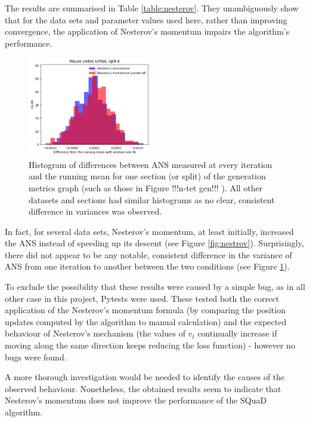 \documentclass{l4proj}
\begin{document}
The results are summarised in Table \ref{table:nesterov}. They unambiguously show that for the data sets and parameter values used here, rather than improving convergence, the application of Nesterov's momentum impairs the algorithm's performance. 

\begin{figure}
    \includegraphics[width=0.48\textwidth]{images/nesterov/histogram.png}

  \caption{Histogram of differences between ANS measured at every iteration and the running mean for one section (or split) of the generation metrics graph (such as those in Figure !!!n-tet gen!!! ). All other datasets and sections had similar histograms as no clear, consistent difference in variances was observed.}
\label{fig:histogram}
\end{figure}

In fact, for several data sets, Nesterov's momentum, at least initially, increased the ANS instead of speeding up its descent (see Figure \ref{fig:nestrov}). Surprisingly, there did not appear to be any notable, consistent difference in the variance of ANS from one iteration to another between the two conditions (see Figure \ref{fig:histogram}).

 To exclude the possibility that these results were caused by a simple bug, as in all other case in this project, Pytests were used. These tested both the correct application of the Nesterov's momentum formula (by comparing the position updates computed by the algorithm to manual calculation) and the expected behaviour of Nesterov's mechanism (the values of $v_t$ continually increase if moving along the same direction keeps reducing the loss function) - however no bugs were found. 

 A more thorough investigation would be needed to identify the causes of the observed behaviour. Nonetheless, the obtained results seem to indicate that Nesterov's momentum does not improve the performance of the SQuaD algorithm.
\end{document}
